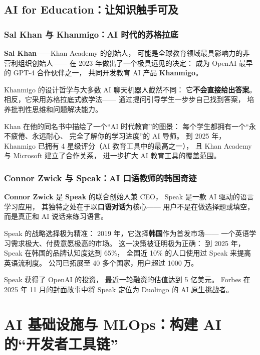 \subsection{AI for Education：让知识触手可及}
\label{subsec:education-ai}

\subsubsection{Sal Khan 与 Khanmigo：AI 时代的苏格拉底}

\textbf{Sal Khan}——Khan Academy 的创始人，
可能是全球教育领域最具影响力的非营利组织创始人——
在 2023 年做出了一个极具远见的决定：
成为 OpenAI 最早的 GPT-4 合作伙伴之一，
共同开发教育 AI 产品 \textbf{Khanmigo}。

Khanmigo 的设计哲学与大多数 AI 聊天机器人截然不同：
它\textbf{不会直接给出答案}。
相反，它采用苏格拉底式教学法——
通过提问引导学生一步步自己找到答案，
培养批判性思维和问题解决能力。

Khan 在他的同名书中描绘了一个``AI 时代教育''的图景：
每个学生都拥有一个``永不疲倦、永远耐心、
完全了解你的学习进度''的 AI 导师。
到 2025 年，Khanmigo 已拥有 4 星级评分（AI 教育工具中的最高之一），
且 Khan Academy 与 Microsoft 建立了合作关系，
进一步扩大 AI 教育工具的覆盖范围。

\subsubsection{Connor Zwick 与 Speak：AI 口语教师的韩国奇迹}

\textbf{Connor Zwick} 是 \textbf{Speak} 的联合创始人兼 CEO，
Speak 是一款 AI 驱动的语言学习应用，
其独特之处在于以\textbf{口语对话}为核心——
用户不是在做选择题或填空，
而是真正和 AI 说话来练习语言。

Speak 的战略选择极为精准：
2019 年，它选择\textbf{韩国}作为首发市场——
一个英语学习需求极大、付费意愿极高的市场。
这一决策被证明极为正确：
到 2025 年，Speak 在韩国的品牌认知度达到 65\%，
全国近 10\% 的人口使用过 Speak 来提高英语流利度。
公司已拓展至 40 多个国家，用户超过 1000 万。

Speak 获得了 OpenAI 的投资，
最近一轮融资的估值达到 5 亿美元。
Forbes 在 2025 年 11 月的封面故事中将 Speak
定位为 Duolingo 的 AI 原生挑战者。


\section{AI 基础设施与 MLOps：构建 AI 的``开发者工具链''}
\label{sec:ent-infra}

